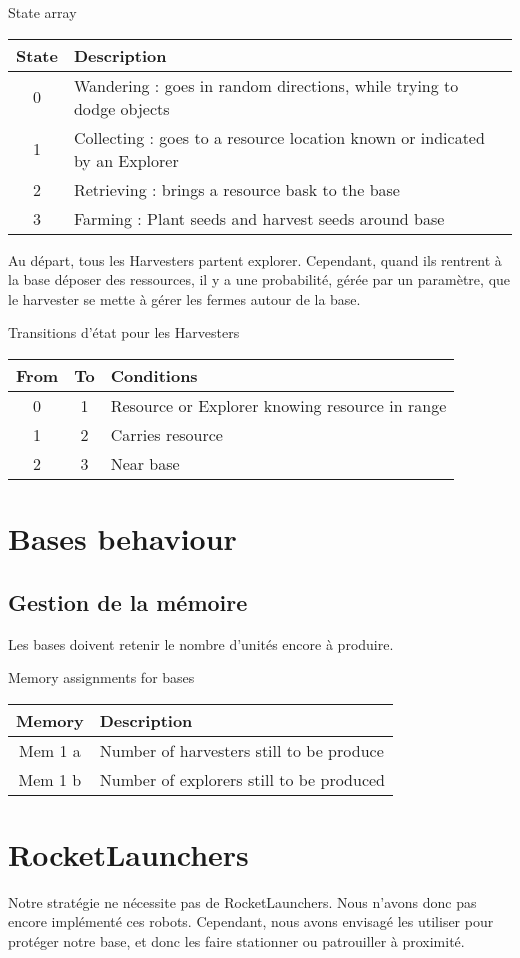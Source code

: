 \documentclass{article}
\begin{document}
\begin{table}[!htb]
	State array\\
	\begin{tabular}{|c|l|}
		\hline
		State & Description \\
		\hline
		0 & Wandering : goes in random directions, while trying to dodge objects\\
		\hline
		1 & Collecting : goes to a resource location known or indicated by an Explorer\\
		\hline
		2 & Retrieving : brings a resource bask to the base\\
		\hline
		3 & Farming : Plant seeds and harvest seeds around base\\
		\hline
	\end{tabular}
\end{table}

Au départ, tous les Harvesters partent explorer.
Cependant, quand ils rentrent à la base déposer des ressources, il y a une probabilité, gérée par un paramètre, que le harvester se mette à gérer les fermes autour de la base.
\newline

\begin{table}[!htb]
	Transitions d'état pour les Harvesters\\
	\begin{tabular}{|c|c|l|}
		\hline
		From & To & Conditions\\
		\hline
		0 & 1 & Resource or Explorer knowing resource in range\\
		\hline
		1 & 2 & Carries resource\\
		\hline
		2 & 3 & Near base\\
		\hline
	\end{tabular}
\end{table}

\section{Bases behaviour}

\subsection{Gestion de la mémoire}

Les bases doivent retenir le nombre d'unités encore à produire.
\begin{table}[!htb]
	Memory assignments for bases\\
	\begin{tabular}{|c|l|}
		\hline
		Memory & Description\\
		\hline
		Mem 1 a & Number of harvesters still to be produce\\
		Mem 1 b & Number of explorers still to be produced\\
		\hline
	\end{tabular}
\end{table}

\section{RocketLaunchers}

Notre stratégie ne nécessite pas de RocketLaunchers.
Nous n'avons donc pas encore implémenté ces robots.
Cependant, nous avons envisagé les utiliser pour protéger notre base, et donc les faire stationner ou patrouiller à proximité.
\end{document}
